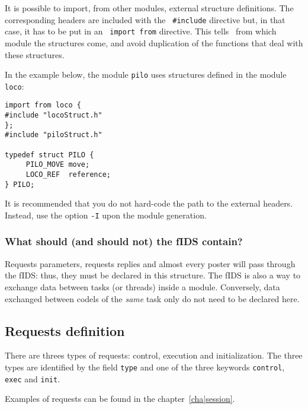 It is  possible to   import,  from  other  modules, external    structure
definitions. The corresponding headers are included with the {\tt
\#include} directive but, in that case, it has to be put in an {\tt
import from}    directive.  This tells \GenoM\     from which module  the
structures come, and  avoid duplication of  the functions that deal  with
these structures.

In the example  below, the module  {\tt pilo} uses  structures defined in
the module {\tt loco}:

\begin{center}\begin{cartouche}\small\begin{verbatim}
import from loco {
#include "locoStruct.h"
};
#include "piloStruct.h"

typedef struct PILO {
     PILO_MOVE move;
     LOCO_REF  reference;
} PILO;
\end{verbatim}\end{cartouche}\end{center}

It is  recommended  that you do not  hard-code  the path  to  the external
headers. Instead, use the option {\tt -I} upon the module generation.


\subsubsection{What should (and should not) the fIDS contain?}

Requests parameters, requests replies  and almost every poster  will pass
through the fIDS: thus, they must be declared in this structure. The fIDS
is also a way to   exchange data between tasks    (or threads) inside   a
module. Conversely, data exchanged between codels of  the {\em same} task
only do not need to be declared here.


\subsection{Requests definition}

There     are  threes   types of      requests:  control, execution   and
initialization. The three types are  identified  by the field {\tt  type}
and one of the three keywords {\tt control}, {\tt exec} and {\tt init}.

Examples of requests can be found in the chapter~\ref{cha|session}.

